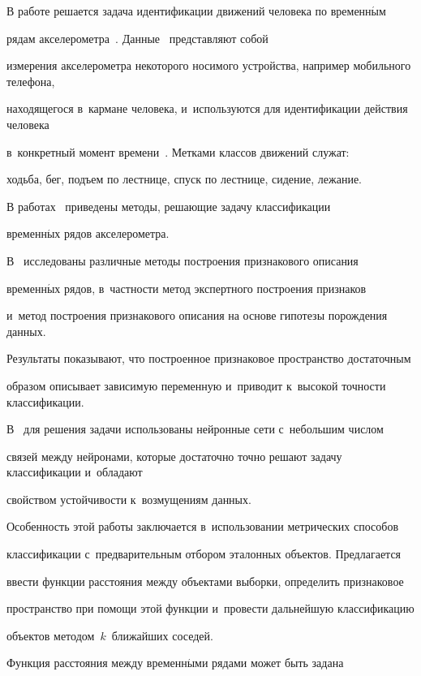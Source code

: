 В работе решается задача идентификации движений человека по временн$\acute{\mbox{ы}}$м 

рядам акселерометра~\cite{Kwapisz2010Activity}. Данные~\cite{Data} представляют собой 

измерения акселе\-ро\-мет\-ра некоторого носимого устройства, например мобильного телефона, 

находящегося в~кармане человека, и~используются для идентификации действия человека 

в~конкретный момент времени~\cite{Gluhak2013survey}. Метками классов движений служат: 

ходьба, бег, подъем по лестнице, спуск по лестнице, сидение, лежание.



В работах~\cite{Kuznetsov,Popova2015} приведены методы, решающие задачу классификации 

временн$\acute{\mbox{ы}}$х рядов акселерометра.

В~\cite{Kuznetsov} исследованы различные методы построения признакового описания 

временн$\acute{\mbox{ы}}$х рядов, в~частности метод экспертного построения признаков 

и~метод построения признакового описания на основе гипотезы порождения данных. 

Результаты показывают, что построенное признаковое пространство достаточным 

образом описывает зависимую переменную и~приводит к~высокой точности классификации.

В~\cite{Popova2015} для решения задачи использованы нейронные сети с~небольшим числом 

связей между нейронами, которые достаточно точно решают задачу классификации и~обладают 

свойством устойчивости к~возмущениям данных.



Особенность этой работы заключается в~использовании метрических способов 

классификации с~предварительным отбором эталонных объектов. Предлагается 

ввести функции расстояния между объектами выборки, определить признаковое 

пространство при помощи этой функции и~провести дальнейшую классификацию 

объектов методом~$k$~ближайших соседей.



Функция расстояния между временн$\acute{\mbox{ы}}$ми рядами может быть задана 

